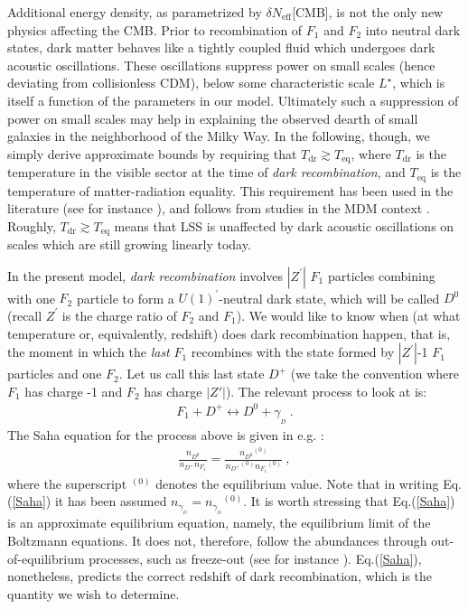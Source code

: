 \documentclass[12pt]{article}
\begin{document}
Additional energy density, as parametrized by $\delta N _{\text{eff}}$[CMB], is not the only new physics affecting the CMB. Prior to recombination of $F _1$ and $F _2$ into neutral dark states, dark matter behaves like a tightly coupled fluid which undergoes dark acoustic oscillations. These oscillations suppress power on small scales (hence deviating from collisionless CDM), below some characteristic scale $L ^{\star}$, which is itself a function of the parameters in our model. Ultimately such a suppression of power on small scales may help in explaining the observed dearth of small galaxies in the neighborhood of the Milky Way. In the following, though, we simply derive approximate bounds by requiring that $T _{\text{dr}} \gtrsim T _{\text{eq}}$, where $T _{\text{dr}}$ is the temperature in the visible sector at the time of \textit{dark recombination}, and $T _{\text{eq}}$ is the temperature of matter-radiation equality. This requirement has been used in the literature (see for instance \cite{volkaspetraki}), and follows from studies in the MDM context \cite{berezhiani,implications,cia}. Roughly, $T _{\text{dr}} \gtrsim T _{\text{eq}}$ means that LSS is unaffected by dark acoustic oscillations on scales which are still growing linearly today.

In the present model, \textit{dark recombination} involves $|Z ^{'}|$ $F _1$ particles combining with one $F _2$ particle to form a $U(1) ^{'}$-neutral dark state, which will be called $D ^0$ (recall $Z ^{'}$ is the charge ratio of $F _2$ and $F _1$). We would like to know when (at what temperature or, equivalently, redshift) does dark recombination happen, that is, the moment in which the \textit{last} $F _1$ recombines with the state formed by $|Z ^{'}|$-1 $F _1$ particles and one $F _2$. Let us call this last state $D ^+$ (we take the convention where $F _1$ has charge -1 and $F _2$ has charge $|Z'|$). The relevant process to look at is:
%
\begin{eqnarray}
F _1 + D ^+ \leftrightarrow D ^0 + \gamma _{_D} \ .
\end{eqnarray}
%
The Saha equation for the process above is given in e.g. \cite{dodelson}:
%
\begin{eqnarray}
\frac{n _{D ^0}}{n _{D ^+} n _{F_1}} = \frac{{n _{D ^0}}^{(0)}}{{n_{D ^+}}^{(0)}{n _{F_1}}^{(0)}} \ ,
\label{Saha}
\end{eqnarray}
%
where the superscript $^{(0)}$ denotes the equilibrium value. Note that in writing Eq.(\ref{Saha}) it has been assumed $n _{\gamma _{_D}} = {n _{\gamma _{_D}}} ^{(0)}$. It is worth stressing that Eq.(\ref{Saha}) is an approximate equilibrium equation, namely, the equilibrium limit of the Boltzmann equations. It does not, therefore, follow the abundances through out-of-equilibrium processes, such as freeze-out (see for instance \cite{dodelson}). Eq.(\ref{Saha}), nonetheless, predicts the correct redshift of dark recombination, which is the quantity we wish to determine.
\end{document}
